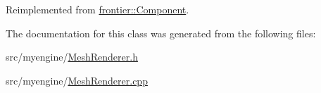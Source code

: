 Reimplemented from \hyperlink{classfrontier_1_1_component_ab920f9bc07ce051ebb5559c5a66508d1}{frontier\+::\+Component}.



The documentation for this class was generated from the following files\+:\begin{DoxyCompactItemize}
\item 
src/myengine/\hyperlink{_mesh_renderer_8h}{Mesh\+Renderer.\+h}\item 
src/myengine/\hyperlink{_mesh_renderer_8cpp}{Mesh\+Renderer.\+cpp}\end{DoxyCompactItemize}
